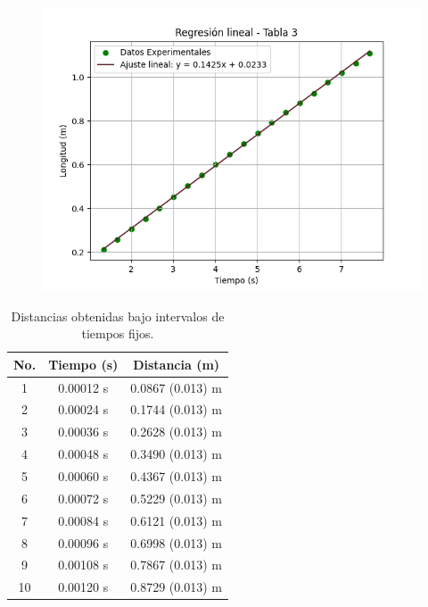 \documentclass[12pt,a4paper]{article}
\begin{document}
\begin{figure}[h!]
\centering
\includegraphics[scale=0.9]{Figure_3.png}
\end{figure}

\begin{table}[h!]
\begin{center}
\begin{tabular}{|c|c|c|}
\hline
No. & Tiempo (s) & Distancia (m) \\
\hline
1  & 0.00012 s & 0.0867 (0.013) m \\ \hline 
2  & 0.00024 s & 0.1744 (0.013) m \\ \hline 
3  & 0.00036 s & 0.2628 (0.013) m \\ \hline 
4  & 0.00048 s & 0.3490 (0.013) m \\ \hline 
5  & 0.00060 s & 0.4367 (0.013) m \\ \hline 
6  & 0.00072 s & 0.5229 (0.013) m\\ \hline 
7  & 0.00084 s & 0.6121 (0.013) m\\ \hline 
8  & 0.00096 s & 0.6998 (0.013) m \\ \hline 
9 & 0.00108 s  & 0.7867 (0.013) m \\ \hline 
10  & 0.00120 s & 0.8729 (0.013) m \\ \hline 
\end{tabular}
\caption{Distancias obtenidas bajo intervalos de tiempos fijos.}
\end{center}
\end{table}
\end{document}
